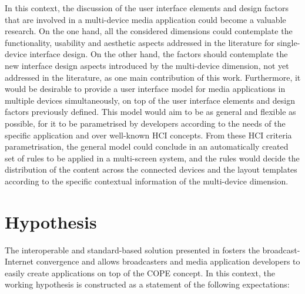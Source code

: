 In this context, the discussion of the user interface elements and design factors that are involved in a multi-device media application could become a valuable research. On the one hand, all the considered dimensions could contemplate the functionality, usability and aesthetic aspects addressed in the literature for single-device interface design. On the other hand, the factors should contemplate the new interface design aspects introduced by the multi-device dimension, not yet addressed in the literature, as one main contribution of this work. Furthermore, it would be desirable to provide a user interface model for media applications in multiple devices simultaneously, on top of the user interface elements and design factors previously defined. This model would aim to be as general and flexible as possible, for it to be parametrised by developers according to the needs of the specific application and over well-known HCI concepts. From these HCI criteria parametrisation, the general model could conclude in an automatically created set of rules to be applied in a multi-screen system, and the rules would decide the distribution of the content across the connected devices and the layout templates according to the specific contextual information of the multi-device dimension.



\section{Hypothesis}\label{hypothesis}

The interoperable and standard-based solution presented in \cite{thesisMikel} fosters the broadcast-Internet convergence and allows broadcasters and media application developers to easily create applications on top of the COPE concept. In this context, the working hypothesis is constructed as a statement of the following expectations:

